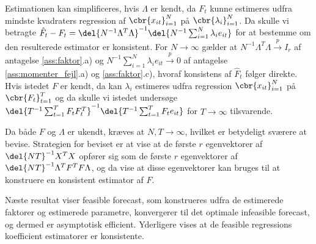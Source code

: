 Estimationen kan simplificeres, hvis \(\Lambda\) er kendt, da \(F_t\)  kunne estimeres udfra mindste kvadraters regression af \(\cbr{x_{it}}_{i=1}^N\) på \(\cbr{\lambda_i}_{i=1}^N\).
Da skulle vi betragte \(\hat{F}_t - F_t = \del{N^{-1} \Lambda^T \Lambda}^{-1} \del{N^{-1} \sum_{i=1}^N \lambda_i e_{it}}\) for at bestemme om den resulterede estimator er konsistent.
For \(N \rightarrow \infty\) gælder at \(N^{-1} \Lambda^T \Lambda \overset{p}{\rightarrow} I_r\) af antagelse \ref{ass:faktor}.a) og \(N^{-1} \sum_{i=1}^N \lambda_i e_{it} \overset{p}{\rightarrow} 0\) af antagelse \ref{ass:momenter_fejl}.a) og \ref{ass:faktor}.c), hvoraf konsistens af \(\hat{F}_t\) følger direkte.
Hvis istedet \(F\) er kendt, da kan \(\lambda_i\) estimeres udfra regression \(\cbr{x_{it}}_{i=1}^N\) på \(\cbr{F_{t}}_{t=1}^T\) og da skulle vi istedet undersøge \(\del{T^{-1} \sum_{t=1}^T F_t F_t^T}^{-1} \del{T^{-1} \sum_{t=1}^T F_t e_{it}}\) for \(T \rightarrow \infty\) tilsvarende.

Da både \(F\) og \(\Lambda\) er ukendt, kræves at \(N, T \rightarrow \infty\), hvilket er betydeligt sværere at bevise.
Strategien for beviset er at vise at de første \(r\) egenvektorer af \(\del{NT}^{-1} X^T X\) opfører sig som de første \(r\) egenvektorer af \(\del{NT}^{-1} \Lambda^T F^T F \Lambda\), og da vise at disse egenvektorer kan bruges til at konstruere en konsistent estimator af \(F\).

Næste resultat viser feasible forecast, som konstrueres udfra de estimerede faktorer og estimerede parametre, konvergerer til det optimale infeasible forecast, og dermed er asymptotisk efficient.
Yderligere vises at de feasible regressions koefficient estimatorer er konsistente.

